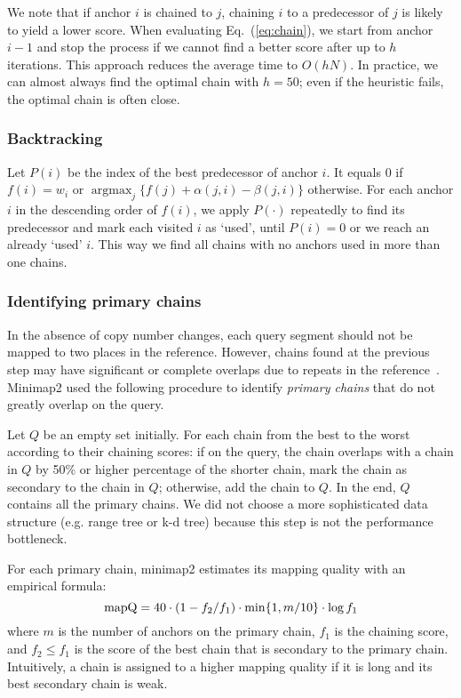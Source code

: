 \documentclass{bioinfo}
\DeclareMathOperator*{\argmax}{argmax}
\begin{document}
\begin{methods}
We note that if anchor $i$ is chained to $j$, chaining $i$ to a predecessor
of $j$ is likely to yield a lower score. When evaluating Eq.~(\ref{eq:chain}),
we start from anchor $i-1$ and stop the process if we cannot find a better
score after up to $h$ iterations. This approach reduces the average time to
$O(hN)$. In practice, we can almost always find the optimal chain with
$h=50$; even if the heuristic fails, the optimal chain is often close.

\subsubsection{Backtracking}
Let $P(i)$ be the index of the best predecessor of anchor $i$. It equals 0 if
$f(i)=w_i$ or $\argmax_j\{f(j)+\alpha(j,i)-\beta(j,i)\}$ otherwise. For each
anchor $i$ in the descending order of $f(i)$, we apply $P(\cdot)$ repeatedly to
find its predecessor and mark each visited $i$ as `used', until $P(i)=0$ or we
reach an already `used' $i$. This way we find all chains with no anchors used
in more than one chains.

\subsubsection{Identifying primary chains}\label{sec:primary}
In the absence of copy number changes, each query segment should not be mapped
to two places in the reference. However, chains found at the previous step may
have significant or complete overlaps due to repeats in the reference~\citep{Li:2010fk}.
Minimap2 used the following procedure to identify \emph{primary chains} that do
not greatly overlap on the query.

Let $Q$ be an empty set initially. For each
chain from the best to the worst according to their chaining scores: if on the
query, the chain overlaps with a chain in $Q$ by 50\% or higher percentage of
the shorter chain, mark the chain as secondary to the chain in $Q$; otherwise,
add the chain to $Q$. In the end, $Q$ contains all the primary chains. We did
not choose a more sophisticated data structure (e.g. range tree or k-d tree)
because this step is not the performance bottleneck.

For each primary chain, minimap2 estimates its mapping quality with an
empirical formula:
\[
{\rm mapQ}=40\cdot (1-f_2/f_1)\cdot\min\{1,m/10\}\cdot\log f_1
\]
where $m$ is the number of anchors on the primary chain, $f_1$ is the chaining
score, and $f_2\le f_1$ is the score of the best chain that is secondary to the
primary chain. Intuitively, a chain is assigned to a higher mapping quality if
it is long and its best secondary chain is weak.


\end{methods}
\end{document}
